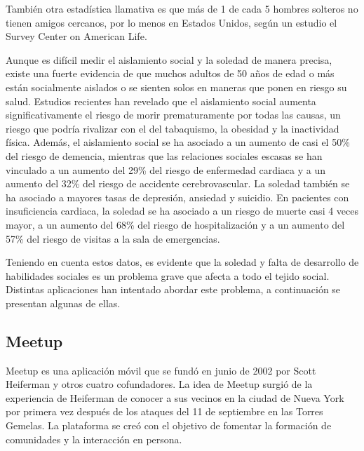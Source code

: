También otra estadística llamativa es que más de 1 de cada 5 hombres solteros no tienen amigos cercanos, 
por lo menos en Estados Unidos, según un estudio el Survey Center on American Life\cite{REF14}.

Aunque es difícil medir el aislamiento social y la soledad de manera precisa, existe una fuerte evidencia de que muchos adultos de 50 años de edad o más están socialmente aislados 
o se sienten solos en maneras que ponen en riesgo su salud. 
Estudios recientes han revelado que el aislamiento social aumenta significativamente el riesgo de morir prematuramente por todas las causas, 
un riesgo que podría rivalizar con el del tabaquismo, la obesidad y la inactividad física. Además, el aislamiento social se ha asociado a un aumento de casi el 50\% del 
riesgo de demencia, mientras que las relaciones sociales escasas se han vinculado a un aumento del 29\% del riesgo de enfermedad cardiaca y a un 
aumento del 32\% del riesgo de accidente cerebrovascular. La soledad también se ha asociado a mayores tasas de depresión, ansiedad y suicidio. 
En pacientes con insuficiencia cardiaca, la soledad se ha asociado a un riesgo de muerte casi 4 veces mayor, a un aumento del 68\% del riesgo de hospitalización y 
a un aumento del 57\% del riesgo de visitas a la sala de emergencias.\cite{REF15}

Teniendo en cuenta estos datos, es evidente que la soledad y falta de desarrollo de habilidades sociales es un problema grave que afecta a todo el tejido social.
Distintas aplicaciones han intentado abordar este problema, a continuación se presentan algunas de ellas.


\subsection{Meetup}
Meetup es una aplicación móvil que se fundó en junio de 2002 por Scott Heiferman 
y otros cuatro cofundadores. La idea de Meetup surgió de la experiencia de Heiferman de 
conocer a sus vecinos en la ciudad de Nueva York por primera vez después de los 
ataques del 11 de septiembre en las Torres Gemelas. La plataforma se creó con el 
objetivo de fomentar la formación de comunidades y la interacción en persona. 

